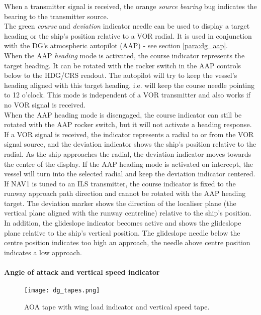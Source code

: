 \documentclass[Orbiter User Manual.tex]{subfiles}
\begin{document}
\noindent
When a transmitter signal is received, the orange \textit{source bearing} bug indicates the bearing to the transmitter source.\\
The green \textit{course} and \textit{deviation} indicator needle can be used to display a target heading or the ship's position relative to a VOR radial. It is used in conjunction with the DG's atmospheric autopilot (AAP) - see section \ref{para:dg_aap}.\\
When the AAP \textit{heading} mode is activated, the course indicator represents the target heading. It can be rotated with the rocker switch in the AAP controls below to the HDG/CRS readout. The autopilot will try to keep the vessel's heading aligned with this target heading, i.e. will keep the course needle pointing to 12 o'clock. This mode is independent of a VOR transmitter and also works if no VOR signal is received.\\
When the AAP heading mode is disengaged, the course indicator can still be rotated with the AAP rocker switch, but it will not activate a heading response. If a VOR signal is received, the indicator represents a radial to or from the VOR signal source, and the deviation indicator shows the ship's position relative to the radial. As the ship approaches the radial, the deviation indicator moves towards the centre of the display. If the AAP heading mode is activated on intercept, the vessel will turn into the selected radial and keep the deviation indicator centered.\\
If NAV1 is tuned to an ILS transmitter, the course indicator is fixed to the runway approach path direction and cannot be rotated with the AAP heading target. The deviation marker shows the direction of the localiser plane (the vertical plane aligned with the runway centreline) relative to the ship's position. In addition, the glideslope indicator becomes active and shows the glideslope plane relative to the ship's vertical position. The glideslope needle below the centre position indicates too high an approach, the needle above centre position indicates a low approach.


\paragraph{Angle of attack and vertical speed indicator}

\begin{figure}[H]
  \centering
  \texttt{[image: dg\_tapes.png]}
  \caption{AOA tape with wing load indicator and vertical speed tape.}
\end{figure}
\end{document}

